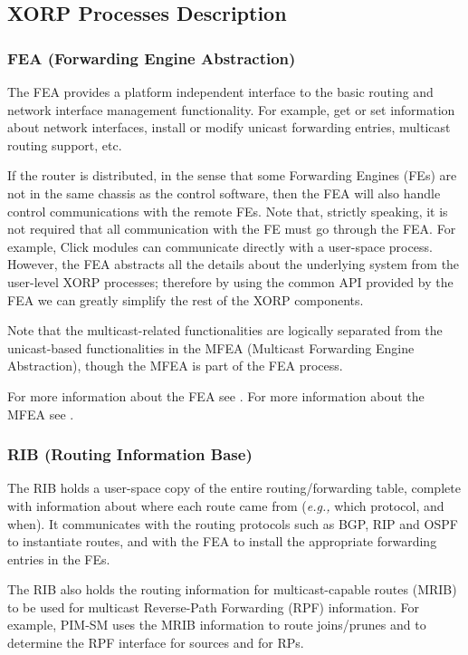 \documentclass[11pt]{article}
\newcommand{\eg}{\emph{e.g.,}\xspace}
\begin{document}
\subsection{XORP Processes Description}
\label{sec:xorp_processes_description}

\subsubsection{FEA (Forwarding Engine Abstraction)}

The FEA provides a platform independent interface to the basic routing
and network interface management functionality.
For example, get or set information about network interfaces, install or
modify unicast forwarding entries, multicast routing support, etc.

If the router is distributed, in the sense that some
Forwarding Engines (FEs) are not in the same chassis as the control
software, then the FEA will also handle control communications with the
remote FEs.  Note that, strictly speaking, it is not required that all
communication with the FE must go through the FEA. For example, Click
modules can communicate directly with a user-space process. However,
the FEA abstracts all the details about the underlying system
from the user-level XORP processes; therefore by using the common API
provided by the FEA we can greatly simplify the rest of the XORP
components.

Note that the multicast-related functionalities are logically separated from
the unicast-based functionalities in the MFEA (Multicast Forwarding Engine
Abstraction), though the MFEA is part of the FEA process.

For more information about the FEA see \cite{xorp:fea}.
For more information about the MFEA see \cite{xorp:mfea}.

\subsubsection{RIB (Routing Information Base)}

The RIB holds a user-space copy of the entire routing/forwarding table,
complete with information about where each route came from (\eg which
protocol, and when). It communicates with the routing protocols such as
BGP, RIP and OSPF to instantiate routes, and with the FEA to install the
appropriate forwarding entries in the FEs.

The RIB also holds the routing information for multicast-capable routes
(MRIB) to be used for multicast Reverse-Path Forwarding (RPF) information.
For example, PIM-SM uses the MRIB information to route joins/prunes and
to determine the RPF interface for sources and for RPs.
\end{document}
